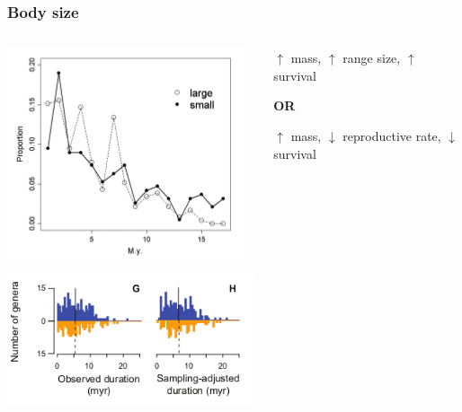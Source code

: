 \documentclass{beamer}
\begin{document}
\begin{frame}
  \frametitle{Body size}
  \begin{columns}
    \begin{column}{0.5\textwidth}
      \includegraphics[height=0.4\textheight,width=\textwidth,keepaspectratio=true]{figure/liowmam}

      \includegraphics[height=0.4\textheight,width=\textwidth,keepaspectratio=true]{figure/susumu}
    \end{column}
    \begin{column}{0.5\textwidth}
      \(\uparrow\) mass, \(\uparrow\) range size, \(\uparrow\) survival

      \vspace{0.3cm}

      \textbf{OR}

      \vspace{0.3cm}

      \(\uparrow\) mass, \(\downarrow\) reproductive rate, \(\downarrow\) survival

    \end{column}
  \end{columns}
\end{frame}
\end{document}
